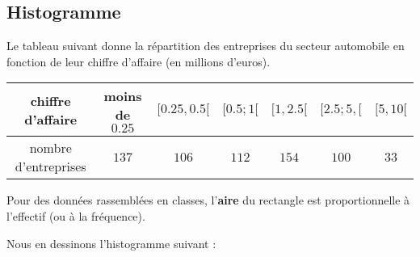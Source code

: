 \begin{center}

\end{center}

\subsection{Histogramme}

Le tableau suivant donne la répartition des entreprises du secteur automobile en fonction de leur chiffre d'affaire (en millions d'euros).

\begin{center}
    \begin{tabular}{|c||c|c|c|c|c|c|}
        \hline
        chiffre d'affaire&moins de \( 0.25\)&\( \mathopen[ 0.25 ,0.5 [\)&$\mathopen[ 0.5;1  [$&$\mathopen[ 1 , 2.5 [$&$\mathopen[ 2.5;5 ,  [$&$\mathopen[ 5 , 10 [$\\
            \hline\hline
            nombre d'entreprises&\( 137\)&\( 106\)&\( 112\)&$154$&\( 100\)&\( 33\)\\
            \hline
    \end{tabular}
\end{center}

\begin{Aretenir}
Pour des données rassemblées en classes, l'\textbf{aire} du rectangle est proportionnelle à l'effectif (ou à la fréquence). 
\end{Aretenir}

Nous en dessinons l'histogramme suivant :
\begin{center}
   
\end{center}


